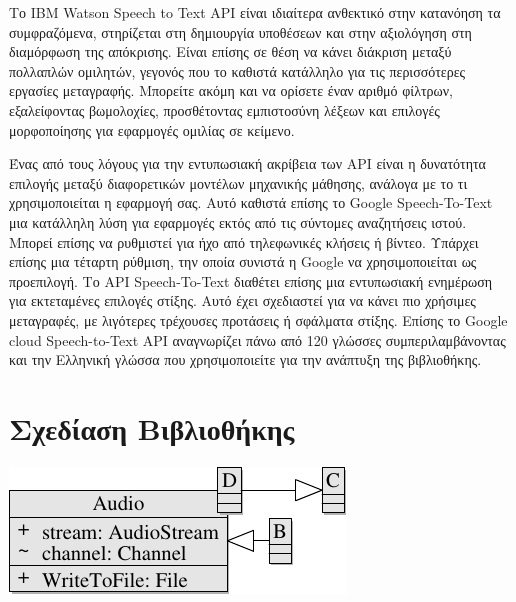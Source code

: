 \documentclass[oneside, 12pt]{book}
\begin{document}
Το IBM Watson Speech to Text API είναι ιδιαίτερα ανθεκτικό στην κατανόηση τα συμφραζόμενα,
στηρίζεται στη δημιουργία υποθέσεων και στην αξιολόγηση στη διαμόρφωση της απόκρισης.
Είναι επίσης σε θέση να κάνει διάκριση μεταξύ πολλαπλών ομιλητών, γεγονός που το καθιστά κατάλληλο
για τις περισσότερες εργασίες μεταγραφής.
Μπορείτε ακόμη και να ορίσετε έναν αριθμό φίλτρων, εξαλείφοντας βωμολοχίες, προσθέτοντας εμπιστοσύνη
λέξεων και επιλογές μορφοποίησης για εφαρμογές ομιλίας σε κείμενο.

Ένας από τους λόγους για την εντυπωσιακή ακρίβεια των API είναι η δυνατότητα επιλογής μεταξύ
διαφορετικών μοντέλων μηχανικής μάθησης, ανάλογα με το τι χρησιμοποιείται η εφαρμογή σας.
Αυτό καθιστά επίσης το Google Speech-To-Text μια κατάλληλη λύση για εφαρμογές εκτός από τις σύντομες
αναζητήσεις ιστού.
Μπορεί επίσης να ρυθμιστεί για ήχο από τηλεφωνικές κλήσεις ή βίντεο.
Υπάρχει επίσης μια τέταρτη ρύθμιση, την οποία συνιστά η Google να χρησιμοποιείται ως προεπιλογή.
Το API Speech-To-Text διαθέτει επίσης μια εντυπωσιακή ενημέρωση για εκτεταμένες επιλογές στίξης.
Αυτό έχει σχεδιαστεί για να κάνει πιο χρήσιμες μεταγραφές, με λιγότερες τρέχουσες προτάσεις ή
σφάλματα στίξης.
Επίσης το Google cloud Speech-to-Text API αναγνωρίζει πάνω από 120 γλώσσες συμπεριλαμβάνοντας και
την Ελληνική γλώσσα που χρησιμοποιείτε για την ανάπτυξη της βιβλιοθήκης.

\section{Σχεδίαση Βιβλιοθήκης}
\label{sec:σχεδίαση-βιβλιοθήκης}
\includegraphics[scale=1]{figures/api_diagram-1.pdf} \\ \vspace{20cm} \\


%
\end{document}
